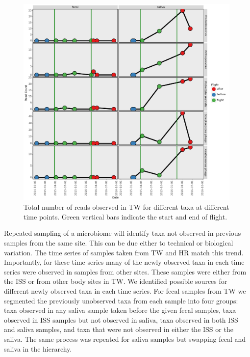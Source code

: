 \begin{figure}
  \begin{center}
    \includegraphics[width=0.99\textwidth]{figs/tw_flight_taxa.png}
	\caption{\small{
	    Total number of reads observed in TW for different taxa at different time points. Green vertical bars indicate the start and end of flight.
	}}
    \label{fig:flighttaxa}
  \end{center}
\end{figure}

Repeated sampling of a microbiome will identify taxa not observed in previous samples from the same site. This can be due either to technical or biological variation. The time series of samples taken from TW and HR match this trend. Importantly, for these time series many of the newly observed taxa in each time series were observed in samples from other sites. These samples were either from the ISS or from other body sites in TW. We identified possible sources for different newly observed taxa in each time series. For fecal samples from TW we segmented the previously unobserved taxa from each sample into four groups: taxa observed in any saliva sample taken before the given fecal samples, taxa observed in ISS samples but not observed in saliva, taxa observed in both ISS and saliva samples, and taxa that were not observed in either the ISS or the saliva. The same process was repeated for saliva samples but swapping fecal and saliva in the hierarchy.

